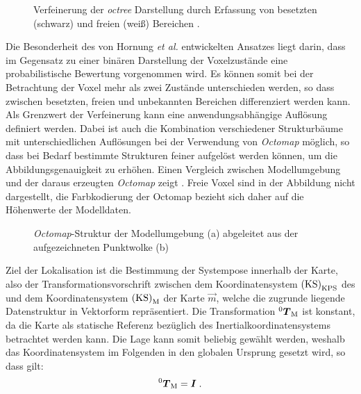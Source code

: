 \begin{figure}[!ht]
	\begin{center}
	\hspace{5mm}
	\caption{Verfeinerung der \textit{octree} Darstellung durch Erfassung von besetzten (schwarz) und freien (weiß) Bereichen \cite{Hornung2013}. }
	\label{fig.octree}
	\end{center}
\end{figure}

Die Besonderheit des von Hornung \textit{et al.} entwickelten Ansatzes liegt darin, dass im Gegensatz zu einer binären Darstellung der Voxelzustände eine probabilistische Bewertung vorgenommen wird. Es können somit bei der Betrachtung der Voxel mehr als zwei Zustände unterschieden werden, so dass zwischen besetzten, freien und unbekannten Bereichen differenziert werden kann. Als Grenzwert der Verfeinerung kann eine anwendungsabhängige Auflösung definiert werden. Dabei ist auch die Kombination verschiedener Strukturbäume mit unterschiedlichen Auflösungen bei der Verwendung von \textit{Octomap} möglich, so dass bei Bedarf bestimmte Strukturen feiner aufgelöst werden können, um die Abbildungsgenauigkeit zu erhöhen. Einen Vergleich zwischen Modellumgebung und der daraus erzeugten \textit{Octomap} zeigt . Freie Voxel sind in der Abbildung nicht dargestellt, die Farbkodierung der Octomap bezieht sich daher auf die Höhenwerte der Modelldaten.\\

\begin{figure}[!ht]
	\begin{center}
	\hspace{5mm}
	\caption{\textit{Octomap}-Struktur der Modellumgebung (a) abgeleitet aus der aufgezeichneten Punktwolke (b)}
	\label{fig.octomap}
	\end{center}
\end{figure}%

\clearpage{}

Ziel der Lokalisation ist die Bestimmung der Systempose innerhalb der Karte, also der Transformationsvorschrift zwischen dem Koordinatensystem ${\mathrm{(KS)}}_{\mathrm{KPS}}$ des  und dem Koordinatensystem ${\mathrm{(KS)}}_{\mathrm{M}}$ der Karte $\vec{m}$, welche die zugrunde liegende Datenstruktur in Vektorform repräsentiert. Die Transformation ${^{\mathrm{0}}\mbox{\boldmath{$T$}}_{\mathrm{M}}}$ ist konstant, da die Karte als statische Referenz bezüglich des Inertialkoordinatensystems betrachtet werden kann. Die Lage kann somit beliebig gewählt werden, weshalb das Koordinatensystem im Folgenden in den globalen Ursprung gesetzt wird, so dass gilt:
%
\begin{equation}
{^{\mathrm{0}}\mbox{\boldmath{$T$}}_{\mathrm{M}}} = \mbox{\boldmath{$I$}} \; \text{.}
\end{equation}

